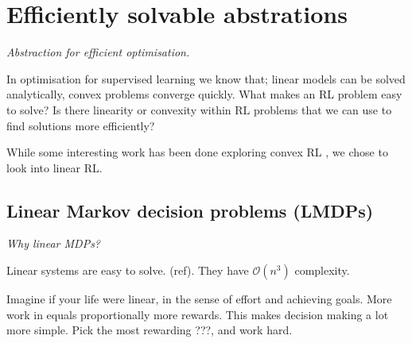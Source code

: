 \newpage
\section{Efficiently solvable abstrations}

\begin{displayquote}
  \textit{Abstraction for efficient optimisation.}
\end{displayquote}

In optimisation for supervised learning we know that;
linear models can be solved analytically,
convex problems converge quickly.
What makes an RL problem easy to solve? Is there linearity or convexity
within RL problems that we can use to find solutions more efficiently?


While some interesting work has been done exploring convex RL \cite{ODonoghue2012a, Barratt2019},
we chose to look into linear RL.

\subsection{Linear Markov decision problems (LMDPs)}

\begin{displayquote}
\textit{Why linear MDPs?}
\end{displayquote}


%


Linear systems are easy to solve. (ref). They have $\mathcal O(n^3)$ complexity.

Imagine if your life were linear, in the sense of effort and achieving goals.
More work in equals proportionally more rewards. This makes decision making
a lot more simple. Pick the most rewarding ???, and work hard.

